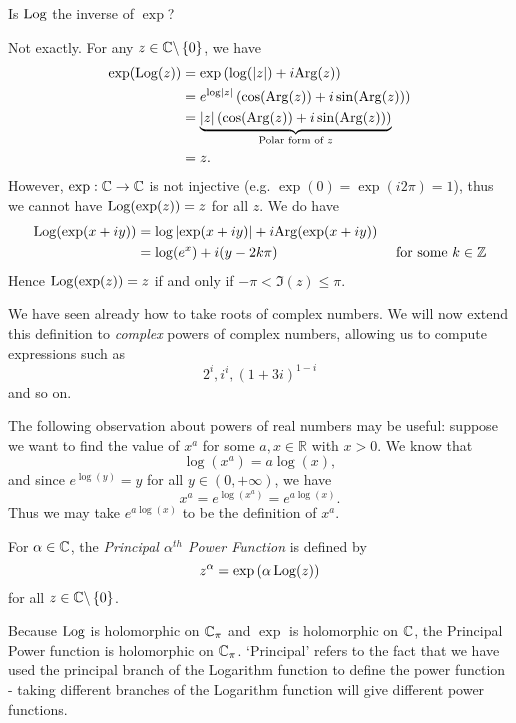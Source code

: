 \begin{question}
Is $\operatorname{Log}$ the inverse of $\exp$?
\end{question}
\begin{answer}
Not exactly.  For any $z \in \mathbb{C} \backslash \left\{0\right\}$, we have
\begin{align*}
\exp ( \operatorname{Log} (z)) & = \exp \left( \log ( \left| z \right| ) + i \mathrm{Arg} (z) \right) \\
& = e^{\log \left| z \right|} \left( \cos ( \mathrm{Arg} (z))+i \sin ( \mathrm{Arg} (z) ) \right) \\
& = \underbrace{\left| z \right|\left( \cos ( \mathrm{Arg} (z))+i \sin ( \mathrm{Arg} (z) ) \right)}_{\text{Polar form of }z} \\
& = z.
\end{align*}
However, $\exp:\mathbb{C} \to \mathbb{C}$ is not injective (e.g. $\exp(0)=\exp(i2\pi)=1$), thus we cannot have $\operatorname{Log} ( \exp(z)) = z$ for all $z$.  We do have
\begin{align*}
\operatorname{Log} ( \exp (x+iy ) ) & = \log \left| \exp(x+iy) \right| + i \mathrm{Arg} (\exp(x+iy)) &&\\
& = \log(e^x) + i (y-2k\pi) && \text{ for some }k \in \mathbb{Z} \\
\end{align*}
Hence $\operatorname{Log} (\exp(z))=z$ if and only if $-\pi<\Im(z) \leq \pi$.
\end{answer}



We have seen already how to take roots of complex numbers. We will now extend this definition to \emph{complex} powers of complex numbers, allowing us to compute expressions such as
\[
2^{i}, i^{i}, (1+3i)^{1-i}
\]
and so on. 
\begin{blankbox}
 The following observation about powers of real numbers may be useful: suppose we want to find the value of $x^a$ for some $a,x \in \mathbb{R}$ with $x>0$.  We know that
\[
\log (x^a) = a \log (x),
\]
and since $e^{\log(y)}=y$ for all $y \in (0,+\infty)$, we have
\[
x^a = e^{  \log \left( x^a \right) } = e^{  a \log (x) }.
\]
Thus we may take $e^{ a \log (x) }$ to be the definition of $x^a$.
\end{blankbox}
\begin{definition}
\label{d:ppower}
For $\alpha \in \mathbb{C}$, the \emph{Principal $\alpha^{th}$ Power Function} is defined by
\[
z^{\alpha} = \exp \left( \alpha \operatorname{Log} (z) \right)
\]
for all $z \in \mathbb{C} \backslash \left\{0\right\}$.
\end{definition}
Because $\operatorname{Log}$ is holomorphic on $\mathbb{C}_{\pi}$ and $\exp$ is holomorphic on $\mathbb{C}$, the Principal Power function is holomorphic on $\mathbb{C}_{\pi}$.  `Principal' refers to the fact that we have used the principal branch of the Logarithm function to define the power function - taking different branches of the Logarithm function will give different power functions.

